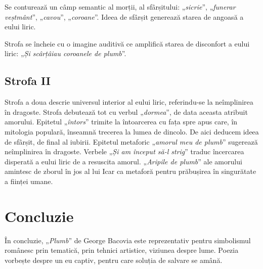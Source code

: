 \documentclass{article}
\newcommand{\qu}[1]{„\emph{#1}”}
\begin{document}
Se conturează un câmp semantic al morții, al sfârșitului: \qu{sicrie}, \qu{funerar veștmânt}, \qu{cavou}, \qu{coroane}. Ideea de sfârșit generează starea de angoasă a eului liric.

Strofa se încheie cu o imagine auditivă ce amplifică starea de disconfort a eului liric: \qu{Și scârțâiau coroanele de plumb}.

\subsection{Strofa II}
Strofa a doua descrie universul interior al eului liric, referindu-se la neîmplinirea în dragoste. Strofa debutează tot cu verbul \qu{dormea}, de data aceasta atribuit amorului. Epitetul \qu{întors} trimite la întoarcerea cu fața spre apus care, în mitologia populară, înseamnă trecerea la lumea de dincolo. De aici deducem ideea de sfârșit, de final al iubirii. Epitetul metaforic \qu{amorul meu de plumb} sugerează neîmplinirea în dragoste. Verbele \qu{Și am început să-l strig} traduc încercarea disperată a eului liric de a resuscita amorul. \qu{Aripile de plumb} ale amorului amintesc de zborul în jos al lui Icar ca metaforă pentru prăbușirea în singurătate a ființei umane.

\section{Concluzie}
În concluzie, \qu{Plumb} de George Bacovia este reprezentativ pentru simbolismul românesc prin tematică, prin tehnici artistice, viziunea despre lume. Poezia vorbește despre un eu captiv, pentru care soluția de salvare se amână.
\end{document}
